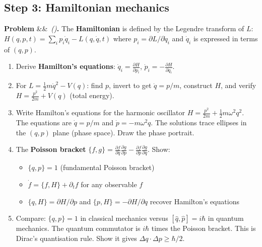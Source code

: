 \documentclass[12pt,a4paper]{article}
\newcounter{problem}
\newenvironment{problem}[1][]{\refstepcounter{problem}\par\vspace{6pt}\noindent\textbf{\color{MidBlue}Problem \theproblem}\ifx&#1&\else\ \textit{(#1)}\fi\textbf{.}\enskip}{\par\vspace{4pt}}
\begin{document}
\subsection{Step 3: Hamiltonian mechanics}

\begin{problem}
\label{prob:hamilton}
The \textbf{Hamiltonian} is defined by the Legendre transform of $L$:
$H(q,p,t) = \sum_i p_i\dot q_i - L(q,\dot q,t)$
where $p_i = \partial L/\partial\dot q_i$ and $\dot q_i$ is expressed in terms of $(q,p)$.
\begin{enumerate}[label=(\alph*),topsep=2pt]
  \item Derive \textbf{Hamilton's equations}: $\dot q_i = \frac{\partial H}{\partial p_i}$, $\dot p_i = -\frac{\partial H}{\partial q_i}$.
  \item For $L = \frac{1}{2}m\dot q^2 - V(q)$: find $p$, invert to get $\dot q = p/m$, construct $H$, and verify $H = \frac{p^2}{2m}+V(q)$ (total energy).
  \item Write Hamilton's equations for the harmonic oscillator $H = \frac{p^2}{2m}+\frac{1}{2}m\omega^2 q^2$. The equations are $\dot q = p/m$ and $\dot p = -m\omega^2 q$. The solutions trace ellipses in the $(q,p)$ plane (phase space). Draw the phase portrait.
  \item The \textbf{Poisson bracket} $\{f,g\} = \frac{\partial f}{\partial q}\frac{\partial g}{\partial p}-\frac{\partial f}{\partial p}\frac{\partial g}{\partial q}$. Show:
    \begin{itemize}[noitemsep]
      \item $\{q,p\}=1$ (fundamental Poisson bracket)
      \item $\dot f = \{f,H\}+\partial_t f$ for any observable $f$
      \item $\{q,H\}=\partial H/\partial p$ and $\{p,H\}=-\partial H/\partial q$ recover Hamilton's equations
    \end{itemize}
  \item Compare: $\{q,p\}=1$ in classical mechanics versus $[\hat q,\hat p]=i\hbar$ in quantum mechanics. The quantum commutator is $i\hbar$ times the Poisson bracket. This is Dirac's quantisation rule. Show it gives $\Delta q\cdot\Delta p\geq\hbar/2$.
\end{enumerate}
\end{problem}
\end{document}
